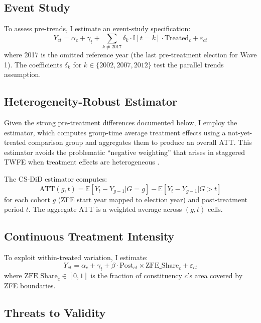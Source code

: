 \documentclass[12pt]{article}
\newcommand{\E}{\mathbb{E}}
\newcommand{\ind}{\mathbb{I}}
\begin{document}
\subsection{Event Study}

To assess pre-trends, I estimate an event-study specification:
\begin{equation}
Y_{ct} = \alpha_c + \gamma_t + \sum_{k \neq 2017} \delta_k \cdot \ind[t = k] \cdot \text{Treated}_c + \varepsilon_{ct}
\label{eq:event_study}
\end{equation}
where 2017 is the omitted reference year (the last pre-treatment election for Wave 1). The coefficients $\delta_k$ for $k \in \{2002, 2007, 2012\}$ test the parallel trends assumption.

\subsection{Heterogeneity-Robust Estimator}

Given the strong pre-treatment differences documented below, I employ the \citet{callaway2021difference} estimator, which computes group-time average treatment effects using a not-yet-treated comparison group and aggregates them to produce an overall ATT. This estimator avoids the problematic ``negative weighting'' that arises in staggered TWFE when treatment effects are heterogeneous \citep{goodman2021difference}.

The CS-DiD estimator computes:
\begin{equation}
\text{ATT}(g,t) = \E[Y_t - Y_{g-1} | G = g] - \E[Y_t - Y_{g-1} | G > t]
\label{eq:cs}
\end{equation}
for each cohort $g$ (ZFE start year mapped to election year) and post-treatment period $t$. The aggregate ATT is a weighted average across $(g,t)$ cells.

\subsection{Continuous Treatment Intensity}

To exploit within-treated variation, I estimate:
\begin{equation}
Y_{ct} = \alpha_c + \gamma_t + \beta \cdot \text{Post}_{ct} \times \text{ZFE\_Share}_c + \varepsilon_{ct}
\label{eq:intensity}
\end{equation}
where $\text{ZFE\_Share}_c \in [0,1]$ is the fraction of constituency $c$'s area covered by ZFE boundaries.

\subsection{Threats to Validity}
\end{document}

